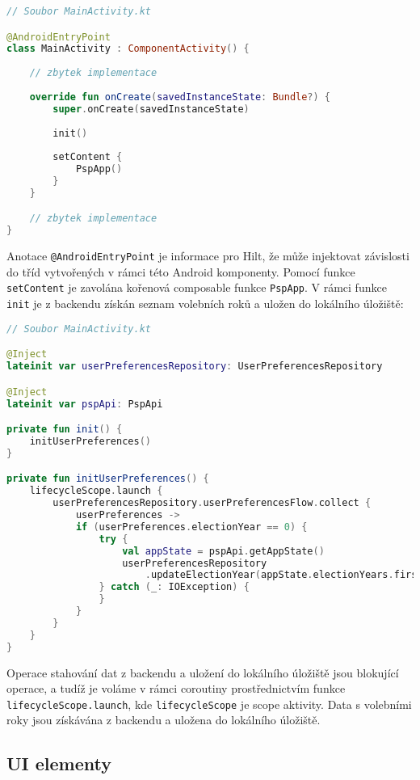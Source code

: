 \begin{lstlisting}[caption={Třída activity}, tabsize=2, language=Kotlin]
// Soubor MainActivity.kt

@AndroidEntryPoint
class MainActivity : ComponentActivity() {
	
	// zbytek implementace
	
	override fun onCreate(savedInstanceState: Bundle?) {
		super.onCreate(savedInstanceState)
		
		init()
		
		setContent {
			PspApp()
		}
	}

	// zbytek implementace
}
\end{lstlisting}

\noindent Anotace \lstinline|@AndroidEntryPoint| je informace pro Hilt, že může injektovat závislosti do tříd vytvořených v rámci této Android komponenty. Pomocí funkce \lstinline|setContent| je zavolána kořenová composable funkce \lstinline|PspApp|. V rámci funkce \lstinline|init| je z backendu získán seznam volebních roků \linebreak a uložen do lokálního úložiště:

\newpage

\begin{lstlisting}[caption={Třída activity}, tabsize=2, language=Kotlin]
// Soubor MainActivity.kt

@Inject
lateinit var userPreferencesRepository: UserPreferencesRepository

@Inject
lateinit var pspApi: PspApi

private fun init() {
	initUserPreferences()
}

private fun initUserPreferences() {
	lifecycleScope.launch {
		userPreferencesRepository.userPreferencesFlow.collect { 
			userPreferences ->
			if (userPreferences.electionYear == 0) {
				try {
					val appState = pspApi.getAppState()
					userPreferencesRepository
						.updateElectionYear(appState.electionYears.first())
				} catch (_: IOException) {
				}
			}
		}
	}
}
\end{lstlisting}

\noindent Operace stahování dat z backendu a uložení do lokálního úložiště jsou blokující operace, a tudíž je voláme v rámci coroutiny prostřednictvím funkce \lstinline|lifecycleScope.launch|, kde \lstinline|lifecycleScope| je scope aktivity. Data s volebními roky jsou získávána z backendu a uložena do lokálního úložiště.

\subsection*{UI elementy}

